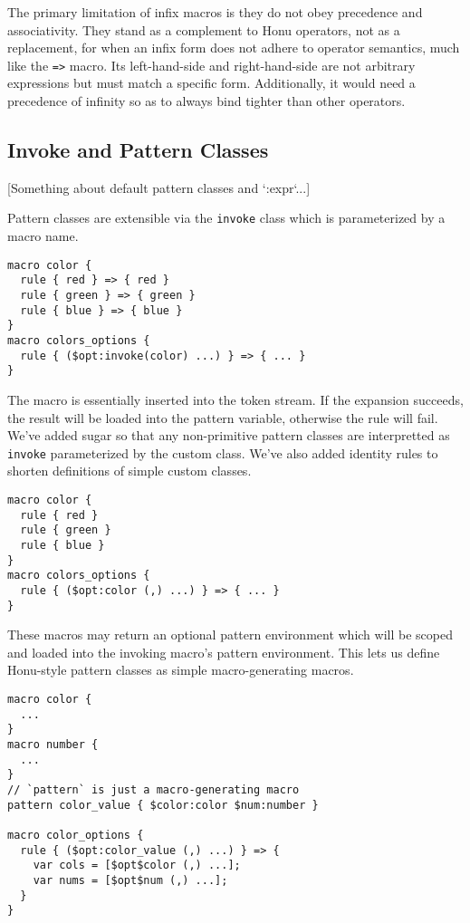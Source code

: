 \documentclass[onecolumn]{sigplanconf-onecolumn}
\begin{document}
The primary limitation of infix macros is they do not obey precedence
and associativity. They stand as a complement to Honu operators, not
as a replacement, for when an infix form does not adhere to operator
semantics, much like the \verb!=>! macro. Its left-hand-side and
right-hand-side are not arbitrary expressions but must match a
specific form. Additionally, it would need a precedence of infinity so
as to always bind tighter than other operators.

\subsection{Invoke and Pattern Classes}
\label{sec-4-2}

[Something about default pattern classes and `:expr`...]

Pattern classes are extensible via the \verb!invoke! class which is
parameterized by a macro name.

\begin{lstlisting}
macro color {
  rule { red } => { red }
  rule { green } => { green }
  rule { blue } => { blue }
}
macro colors_options {
  rule { ($opt:invoke(color) ...) } => { ... }
}
\end{lstlisting}

The macro is essentially inserted into the token stream. If the
expansion succeeds, the result will be loaded into the pattern
variable, otherwise the rule will fail. We've added sugar so that any
non-primitive pattern classes are interpretted as \verb!invoke!
parameterized by the custom class. We've also added identity rules to
shorten definitions of simple custom classes.

\begin{lstlisting}
macro color {
  rule { red }
  rule { green }
  rule { blue }
}
macro colors_options {
  rule { ($opt:color (,) ...) } => { ... }
}
\end{lstlisting}

These macros may return an optional pattern environment which will be
scoped and loaded into the invoking macro's pattern environment. This
lets us define Honu-style pattern classes as simple macro-generating
macros.

\begin{lstlisting}
macro color {
  ...
}
macro number {
  ...
}
// `pattern` is just a macro-generating macro
pattern color_value { $color:color $num:number }

macro color_options {
  rule { ($opt:color_value (,) ...) } => {
    var cols = [$opt$color (,) ...];
    var nums = [$opt$num (,) ...];
  }
}

\end{lstlisting}
\end{document}
